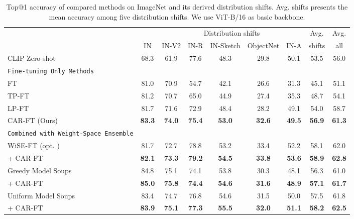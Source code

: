 \documentclass[pdflatex,sn-basic,iicol]{sn-jnl}
\theoremstyle{thmstyleone}\newtheorem{theorem}{Theorem}\newtheorem{proposition}[theorem]{Proposition}
\theoremstyle{thmstyletwo}\newtheorem{example}{Example}\newtheorem{remark}{Remark}
\theoremstyle{thmstylethree}\newtheorem{definition}{Definition}
\begin{document}
\begin{table*}[t]\footnotesize
\begin{center}
\caption{Top@1 accuracy of compared methods on ImageNet and its derived distribution shifts. Avg. shifts presents the mean accuracy among five distribution shifts. We use ViT-B/16 as basic backbone.} \label{tab:imagenet}
\begin{tabular}{lc|ccccc|cc}
\toprule
 & & \multicolumn{5}{c|}{Distribution shifts} & Avg. & Avg. \\
 & IN & IN-V2 & IN-R & IN-Sketch & ObjectNet & IN-A & shifts & all \\
\midrule
CLIP Zero-shot & 68.3 & 61.9 & 77.6 & 48.3 & 29.8 & 50.1 & 53.5 & 56.0 \\
\texttt{Fine-tuning Only Methods}  & & & & & & & \\
\quad  FT & 81.0 & 70.9 & 54.7 & 42.1 & 26.6 & 31.3 & 45.1 & 51.1 \\
\quad  TP-FT & 81.2 & 70.7 & 65.0 & 44.9 & 27.4 & 35.3 & 48.7 & 54.1 \\
\quad  LP-FT & 81.7 & 71.6 & 72.9 & 48.4 & 28.2 & 49.1 & 54.0 & 58.7 \\
\rowcolor{tabhighlight}
\quad  CAR-FT (Ours) & \textbf{83.3} & \textbf{74.0} & \textbf{75.4} & \textbf{53.0} & \textbf{32.6} & \textbf{49.5} & \textbf{56.9} & \textbf{61.3}\\
\midrule
\texttt{Combined with Weight-Space Ensemble}  & & & & & & & \\
\quad WiSE-FT (opt. ) & 81.7 & 72.7 & 78.8 & 53.2 & 33.4 & 52.2 & 58.1 & 62.0 \\
\rowcolor{tabhighlight}
\quad + CAR-FT & \textbf{82.1} & \textbf{73.3} & \textbf{79.2} & \textbf{54.5} & \textbf{33.8} & \textbf{53.6} & \textbf{58.9} & \textbf{62.8} \\
\midrule
\quad Greedy Model Soups & 84.8 & 75.1 & 74.1 & 53.8 & 30.3 & 48.1 & 56.3 & 61.0 \\
\rowcolor{tabhighlight}
\quad + CAR-FT & \textbf{85.0} & \textbf{75.8} & \textbf{74.4} & \textbf{54.6} & \textbf{31.6} & \textbf{48.9} & \textbf{57.1} & \textbf{61.7} \\
\midrule
\quad Uniform Model Soups & 83.4 & 74.7 & 76.8 & 54.6 & 31.5 & 50.0 & 57.5 & 61.8 \\
\rowcolor{tabhighlight}
\quad + CAR-FT & \textbf{83.9} & \textbf{75.1} & \textbf{77.3} & \textbf{55.5} & \textbf{32.0} & \textbf{51.1} & \textbf{58.2} & \textbf{62.5}\\

\bottomrule
\end{tabular}
\end{center}
\end{table*}
\end{document}
